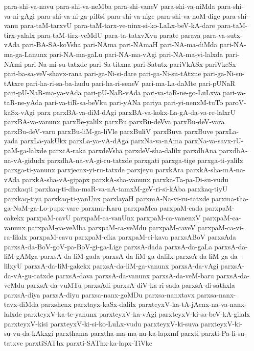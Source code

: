 {para-shi-va-navu
para-shi-va-neMba
para-shi-vaneV
para-shi-va-niMda
para-shi-va-ni-gAgi
para-shi-va-ni-ga-piRsi
para-shi-va-nige
para-shi-va-noM-dige
para-shi-vanu
para-taM-tarxvU
para-taM-tarx-ve-ninx-si-ko-LaLx-beV-kA-dare
para-taM-tirx-yalalx
para-taM-tirx-yeMdU
para-ta-tatxvXvu
parate
parava
para-va-sutx-vAda
pari-BA-SA-koVsha
pari-NAma
pari-NAmaH
pari-NA-ma-diMda
pari-NA-ma-ga-Lanunx
pari-NA-ma-gaLu
pari-NA-ma-vAgi
pari-NA-ma-vi-lalxda
pari-NAmi
pari-Na-mi-su-tatxde
pari-Sa-titxna
pari-Satutx
pariVkASx
pariVkeSx
pari-ba-sa-veV-shavx-rana
pari-ga-Ni-si-dare
pari-ga-Ni-su-tAtxne
pari-ga-Ni-su-tAtxre
pari-ha-ri-sa-ba-hudu
pari-ha-ri-seneV
pari-ma-La-daMte
pari-pUNaR
pari-pU-NaR-ma-ya-vAda
pari-pU-NaR-vAda
pari-va-taR-ne-go-LuLxva
pari-va-taR-ne-yAda
pari-va-tiR-sa-beVku
pari-yANa
pariya
pari-yi-nenxM-tuTo
paroV-kaSx-vAgi
parx
parxBA-va-diM-dAgi
parxBA-va-kokx-La-gA-da-va-re-lalxrU
parxBA-va-vanunx
parxBe-yalilx
parxBu
parxBu-deVva
parxBu-deV-vara
parxBu-deV-varu
parxBu-liM-ga-liVle
parxBuliV
parxBuva
parxBuve
parxLa-yada
parxLa-yakUkx
parxLa-ya-vA-dAga
parxNa-va-nAma
parxNa-va-savx-rU-paM-ga-lalxde
parxcA-raka
parxdeVsha
parxdeV-sha-dalilx
parxdhAna
parxdhA-na-vA-gidudx
parxdhA-na-vA-gi-ru-tatxde
parxgati
parxga-tige
parxga-ti-yalilx
parxga-ti-yanunx
parxjecnx-yi-ru-tatxde
parxjeyu
parxkAra
parxkA-sha-mA-na-vAda
parxkA-sha-vA-gipapx
parxkA-sha-vanunx
parxka-Ta-pa-Di-su-vudu
parxkaqti
parxkaq-ti-dha-maR-va-nA-tamxM-geV-ri-si-kAba
parxkaq-tiyU
parxkaq-tiya
parxkaq-ti-yanUnx
parxlayaH
parxmA-Na-vi-ru-tatxde
parxma-tha-ga-NaM-ga-Lo-pupx-vare
parxmu-Karu
parxpaMca
parxpaM-cada
parxpaM-cakekx
parxpaM-cavU
parxpaM-ca-vanUnx
parxpaM-ca-vanenxV
parxpaM-ca-vanunx
parxpaM-ca-veMba
parxpaM-ca-veMdu
parxpaM-caveV
parxpaM-ca-vi-ra-lilalx
parxpaM-cavu
parxpaM-cika
parxpaM-ci-kava
parxsABoV
parxsAda
parxsA-da-BoV-goV-pa-BoV-gi-ga-Lige
parxsA-dada
parxsA-da-gaLa
parxsA-da-liM-gAMga
parxsA-da-liM-gada
parxsA-da-liM-ga-dalilx
parxsA-da-liM-ga-da-lilxyU
parxsA-da-liM-gakekx
parxsA-da-liM-ga-vanunx
parxsA-da-vAgi
parxsA-da-vA-gu-tatxde
parxsA-dava
parxsA-da-vanunx
parxsA-da-veM-baru
parxsA-da-veMdu
parxsA-da-vuMTu
parxsAdi
parxsA-diV-ka-ri-sada
parxsA-di-sathxla
parxsA-diya
parxsA-diyu
parxsa-nanx-goMDu
parxsa-nanxtavx
parxsa-nanx-tavx-diMda
parxshenx
parxtayx-kaSx-dalilx
parxteyxV-ka-tA-jAcnx-na-va-nanx-lalxde
parxteyxV-ka-te-yanunx
parxteyxV-ka-vAgi
parxteyxV-ki-sa-beV-kA-gilalx
parxteyxV-kisi
parxteyxV-ki-si-ko-LuLx-vudu
parxteyxV-ki-suva
parxteyxV-ki-su-vu-da-kAkxgi
parxthama
parxtha-ma-ma-nu-ka-lapxmf
parxti
parxti-Pa-li-su-tatxve
parxtiSAThx
parxti-SAThx-ka-lapx-TiVke
}
